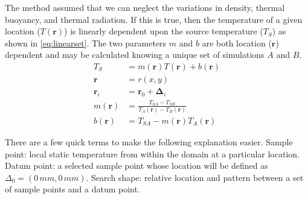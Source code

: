 \documentclass[preprint,12pt]{elsarticle}
\newcommand{\bv}[1]{\boldsymbol #1}  %
\begin{document}
The method assumed that we can neglect the variations in density, thermal buoyancy, and thermal radiation.  If this is true, then the temperature of a given location ($T\left( \bv r \right)$) is linearly dependent upon the source temperature ($T_S$) as shown in \cref{eq:linearset}.  The two parameters $m$ and $b$ are both location ($\bv{r}$) dependent and may be calculated knowing a unique set of simulations $A$ and $B$.
\begin{subequations}
\label{eq:linearset}
\begin{align}
T_S &= m\left(  \bv r  \right) T\left( \bv r \right) + b\left( \bv r \right) \label{eq:linear} \\
\bv r &= r\left( x, y\right) \label{eq:vector}\\
\bv{r_i} & = \bv{r_0} + \bv{\Delta_i} \label{eq:delta}\\
m\left( \bv r \right) &= \frac{T_{SA} - T_{SB}}{T_A\left( \bv r \right) - T_B\left( \bv r \right)} \label{eq:m} \\
b\left( \bv r \right) &= T_{SA} - m\left( \bv r \right) T_A \left( \bv r \right) \label{eq:b}
\end{align}
\end{subequations}

There are a few quick terms to make the following explanation easier.  Sample point: local static temperature from within the domain at a particular location.  Datum point: a selected sample point whose location will be defined as $\Delta_{0} = (0\,mm,0\,mm)$.  Search shape: relative location and pattern between a set of sample points and a datum point.
\end{document}
